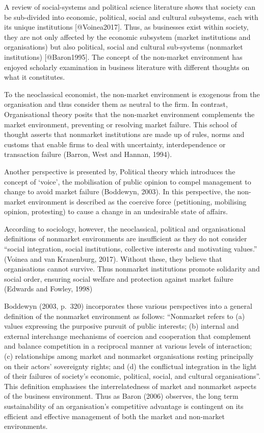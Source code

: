 \documentclass[
]{mitthesis}
\begin{document}
A review of social-systems and political science literature shows that society can be sub-divided into economic, political, social and cultural subsystems, each with its unique institutions {[}@Voinea2017{]}. Thus, as businesses exist within society, they are not only affected by the economic subsystem (market institutions and organisations) but also political, social and cultural sub-systems (nonmarket institutions) {[}@Baron1995{]}. The concept of the non-market environment has enjoyed scholarly examination in business literature with different thoughts on what it constitutes.

To the neoclassical economist, the non-market environment is exogenous from the organisation and thus consider them as neutral to the firm. In contrast, Organisational theory posits that the non-market environment complements the market environment, preventing or resolving market failure. This school of thought asserts that nonmarket institutions are made up of rules, norms and customs that enable firms to deal with uncertainty, interdependence or transaction failure (Barron, West and Hannan, 1994).

Another perspective is presented by, Political theory which introduces the concept of `voice', the mobilisation of public opinion to compel management to change to avoid market failure (Boddewyn, 2003). In this perspective, the non-market environment is described as the coercive force (petitioning, mobilising opinion, protesting) to cause a change in an undesirable state of affairs.

According to sociology, however, the neoclassical, political and organisational definitions of nonmarket environments are insufficient as they do not consider ``social integration, social institutions, collective interests and motivating values.'' (Voinea and van Kranenburg, 2017). Without these, they believe that organisations cannot survive. Thus nonmarket institutions promote solidarity and social order, ensuring social welfare and protection against market failure (Edwards and Fowley, 1998)

Boddewyn (2003, p.~320) incorporates these various perspectives into a general definition of the nonmarket environment as follows:
``Nonmarket refers to (a) values expressing the purposive pursuit of public interests; (b) internal and external interchange mechanisms of coercion and cooperation that complement and balance competition in a reciprocal manner at various levels of interaction; (c) relationships among market and nonmarket organisations resting principally on their actors' sovereignty rights; and (d) the conflictual integration in the light of their failures of society's economic, political, social, and cultural organisations''.
This definition emphasises the interrelatedness of market and nonmarket aspects of the business environment. Thus as Baron (2006) observes, the long term sustainability of an organisation's competitive advantage is contingent on its efficient and effective management of both the market and non-market environments.
\end{document}
